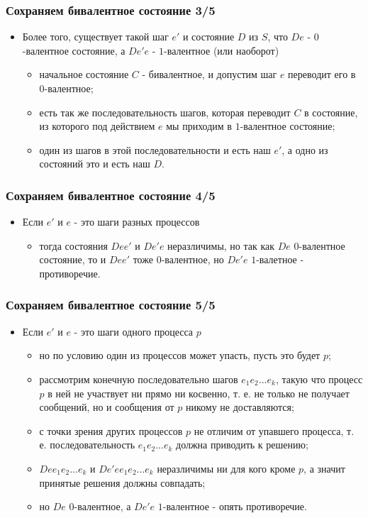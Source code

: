 \begin{frame}
\frametitle{Сохраняем бивалентное состояние 3/5}
\begin{itemize}
  \item Более того, существует такой шаг $e'$ и состояние $D$ из $S$, что $De$ -
  $0$-валентное состояние, а $De'e$ - $1$-валентное (или наоборот)
  \begin{itemize}
    \item начальное состояние $C$ - бивалентное, и допустим шаг $e$ переводит
    его в $0$-валентное;
    \item есть так же последовательность шагов, которая переводит $C$ в
    состояние, из которого под действием $e$ мы приходим в $1$-валентное
    состояние;
    \item один из шагов в этой последовательности и есть наш $e'$, а одно из
    состояний это и есть наш $D$.
  \end{itemize}
\end{itemize}
\end{frame}

\begin{frame}
\frametitle{Сохраняем бивалентное состояние 4/5}
\begin{itemize}
  \item Если $e'$ и $e$ - это шаги разных процессов
  \begin{itemize}
    \item тогда состояния $Dee'$ и $De'e$ неразличимы, но так как $De$
    $0$-валентное состояние, то и $Dee'$ тоже $0$-валентное, но $De'e$
    $1$-валетное - противоречие.
  \end{itemize}
\end{itemize}
\end{frame}

\begin{frame}
\frametitle{Сохраняем бивалентное состояние 5/5}
\begin{itemize}
  \item Если $e'$ и $e$ - это шаги одного процесса $p$
  \begin{itemize}
    \item но по условию один из процессов может упасть, пусть это будет $p$;
    \item рассмотрим конечную последовательно шагов $e_1e_2...e_k$, такую что
    процесс $p$ в ней не участвует ни прямо ни косвенно, т. е. не только не
    получает сообщений, но и сообщения от $p$ никому не доставляются;
    \item с точки зрения других процессов $p$ не отличим от упавшего процесса,
    т. е. последовательность $e_1e_2...e_k$ должна приводить к решению;
    \item $Dee_1e_2...e_k$ и $De'ee_1e_2...e_k$ неразличимы ни для кого кроме
    $p$, а значит принятые решения должны совпадать;
    \item но $De$ $0$-валентное, а $De'e$ $1$-валентное - опять противоречие.
  \end{itemize}
\end{itemize}
\end{frame}

